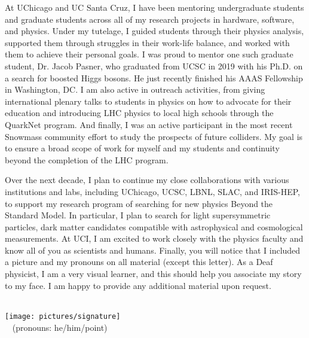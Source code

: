 \documentclass[10pt,letterpaper,sans]{moderncv} %
\makeatletter
\renewcommand*{\makeletterclosing}{
  \@closing\\[0.5em]%
  \texttt{[image: pictures/signature]}\\%
  {\bfseries \@firstname~\@lastname} (pronouns: he/him/point)%
  \ifthenelse{\isundefined{\@enclosure}}{}{%
    \\%
    \vfill%
    {\color{color2}\itshape\enclname: \@enclosure}}}
\makeatother
\begin{document}
At UChicago and UC Santa Cruz, I have been mentoring undergraduate students and graduate students across all of my research projects in hardware, software, and physics. Under my tutelage, I guided students through their physics analysis, supported them through struggles in their work-life balance, and worked with them to achieve their personal goals. I was proud to mentor one such graduate student, Dr. Jacob Pasner, who graduated from UCSC in 2019 with his Ph.D. on a search for boosted Higgs bosons. He just recently finished his AAAS Fellowship in Washington, DC. I am also active in outreach activities, from giving international plenary talks to students in physics on how to advocate for their education and introducing LHC physics to local high schools through the QuarkNet program. And finally, I was an active participant in the most recent Snowmass community effort to study the prospects of future colliders. My goal is to ensure a broad scope of work for myself and my students and continuity beyond the completion of the LHC program.

Over the next decade, I plan to continue my close collaborations with various institutions and labs, including UChicago, UCSC, LBNL, SLAC, and IRIS-HEP, to support my research program of searching for new physics Beyond the Standard Model. In particular, I plan to search for light supersymmetric particles, dark matter candidates compatible with astrophysical and cosmological measurements. At UCI, I am excited to work closely with the physics faculty and know all of you as scientists and humans. Finally, you will notice that I included a picture and my pronouns on all material (except this letter). As a Deaf physicist, I am a very visual learner, and this should help you associate my story to my face. I am happy to provide any additional material upon request.

\makeletterclosing
\end{document}
